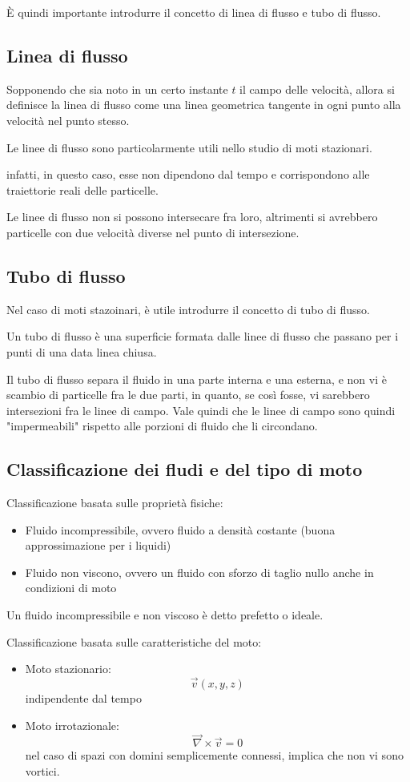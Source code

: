 \documentclass[11pt, a4paper, openright]{book}
\theoremstyle{plain}
\theoremstyle{definition}
\begin{document}
È quindi importante introdurre il concetto di linea di flusso e tubo di flusso.

\subsection{Linea di flusso}
Sopponendo che sia noto in un certo instante $t$ il campo delle velocità, allora si definisce la linea di flusso come una linea geometrica tangente in ogni punto alla velocità nel punto stesso. 

Le linee di flusso sono particolarmente utili nello studio di moti stazionari.

infatti, in questo caso, esse non dipendono dal tempo e corrispondono alle traiettorie reali delle particelle.

Le linee di flusso non si possono intersecare fra loro, altrimenti si avrebbero particelle con due velocità diverse nel punto di intersezione.

\subsection{Tubo di flusso}
Nel caso di moti stazoinari, è utile introdurre il concetto di tubo di flusso.

Un tubo di flusso è una superficie formata dalle linee di flusso che passano per i punti di una data linea chiusa.

Il tubo di flusso separa il fluido in una parte interna e una esterna, e non vi è scambio di particelle fra le due parti, in quanto, se così fosse, vi sarebbero intersezioni fra le linee di campo. Vale quindi che le linee di campo sono quindi "impermeabili" rispetto alle porzioni di fluido che li circondano.

\subsection{Classificazione dei fludi e del tipo di moto}
Classificazione basata sulle proprietà fisiche:
\begin{itemize}
    \item Fluido incompressibile, ovvero fluido a densità costante (buona approssimazione per i liquidi)
    \item Fluido non viscono, ovvero un fluido con sforzo di taglio nullo anche in condizioni di moto
\end{itemize}
Un fluido incompressibile e non viscoso è detto prefetto o ideale.

Classificazione basata sulle caratteristiche del moto:
\begin{itemize}
    \item Moto stazionario:
    \begin{equation}
        \vec{v}(x, y, z)
    \end{equation}
    indipendente dal tempo
    \item Moto irrotazionale:
    \begin{equation}
        \vec{\nabla} \times \vec{v} = 0
    \end{equation}
    nel caso di spazi con domini semplicemente connessi, implica che non vi sono vortici.
\end{itemize}
\end{document}
